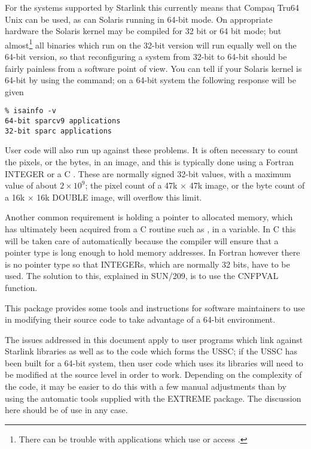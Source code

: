 \documentclass[twoside,11pt]{article}
\newcommand{\xref}[3]{#1}
\renewcommand{\_}{\texttt{\symbol{95}}}
\begin{document}
For the systems supported by
Starlink this currently means that Compaq Tru64 Unix can be used,
as can Solaris running in 64-bit mode.  
On appropriate hardware the Solaris kernel 
may be compiled for 32 bit or 64 bit mode;
but almost\footnote{
   There can be trouble with applications which use 
    or access .}
all binaries which run on the 32-bit version
will run equally well on the 64-bit version, 
so that reconfiguring a system from 32-bit to 64-bit should be
fairly painless from a software point of view.
You can tell if your Solaris kernel is 64-bit 
by using the  command; on a 64-bit system the
following response will be given
\begin{squote}
\begin{verbatim}
% isainfo -v
64-bit sparcv9 applications
32-bit sparc applications
\end{verbatim}
\end{squote}

User code will also run up against these problems.
It is often necessary to count the pixels, or the bytes,
in an image, and this is typically done using a Fortran INTEGER
or a C .  These are normally signed 32-bit values, with
a maximum value of about $2 \times 10^9$; the pixel count of a 
47k $\times$ 47k image, or the byte count of a 16k $\times$ 16k 
\_DOUBLE image, will overflow this limit.

Another common requirement is holding a pointer 
to allocated memory, which has ultimately been 
acquired from a C routine such as , 
in a variable.
In C this will be taken care of automatically because the compiler
will ensure that a pointer type is long enough to hold memory addresses.
In Fortran however there is no pointer type so that INTEGERs, which are
normally 32 bits, have to be used.
The solution to this, explained in \xref{SUN/209}{sun209}{pointers},
is to use the \xref{CNF\_PVAL}{sun209}{CNF\_PVAL} function.

This package provides some tools and instructions for 
software maintainers to use 
in modifying their source code to take advantage of a 64-bit environment.

The issues addressed in this document apply to user programs which link
against Starlink libraries as well as to the code which forms the USSC;
if the USSC has been built for a 64-bit system, then user code 
which uses its libraries will need to be modified at the 
source level in order to work.
Depending on the complexity of the code, it may be easier to do this
with a few manual adjustments than by using the automatic 
tools supplied with the EXTREME package.  
The discussion here should be of use in any case.
\end{document}
